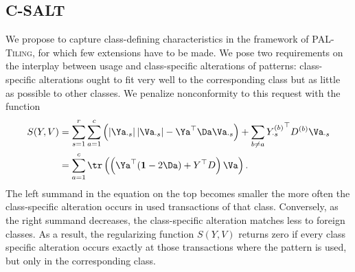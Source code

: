 \subsection{C-SALT}\label{sec:CS:CSalt}
We propose to capture class-defining characteristics in the framework of \textsc{PAL-Tiling}, for which few extensions have to be made.
We pose two requirements on the interplay between usage and class-specific alterations of patterns: class-specific alterations ought to fit very well to the corresponding class but as little as possible to other classes.
We  penalize nonconformity to this request with the function
\begin{align*}
S(Y,V) &= \sum_{s=1}^r\sum_{a=1}^c \left(\left|\Ya_{\cdot s}\right|\left|\Va_{\cdot s}\right|-{\Ya}^\top \Da \Va_{\cdot s}\right)+\sum_{b\neq a}{Y^{(b)}_{\cdot s}}^\top D^{(b)}\Va_{\cdot s}\\
&=\sum_{a=1}^c\tr\left(\left({\Ya}^\top (\mathbf{1}-2\Da) + Y^\top D\right)\Va\right).
\end{align*}
The left summand in the equation on the top becomes smaller the more often the class-specific alteration occurs in used transactions of that class. Conversely, as the right summand decreases, the class-specific alteration matches less to foreign classes. As a result, the regularizing function $S(Y,V)$ returns zero if every class specific alteration occurs exactly at those transactions where the pattern is used, but only in the corresponding class. 

